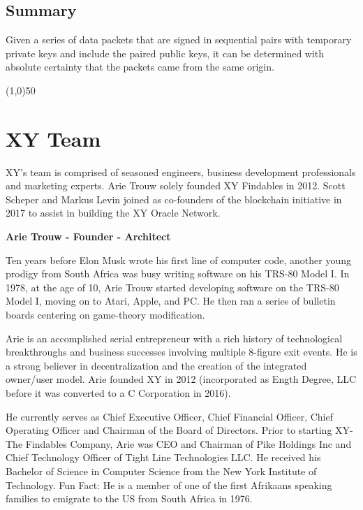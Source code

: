 \documentclass{article}
\begin{document}
\subsection {Summary}
Given a series of data packets that are signed in sequential pairs with temporary private keys and include the paired public keys, it can be determined with absolute \gls{certainty} that the packets came from the same origin.

\begin{center}
\line(1,0){50}
\end{center}
\clearpage

\section {XY Team}
XY's team is comprised of seasoned engineers, business development professionals and marketing experts. Arie Trouw solely founded XY Findables in 2012. Scott Scheper and Markus Levin joined as co-founders of the blockchain initiative in 2017 to assist in building the XY Oracle Network.

\begin {framed}
\begin {center}
\textbf{Arie Trouw - Founder - Architect}\par
\end {center}
Ten years before Elon Musk wrote his first line of computer code, another young prodigy from South Africa was busy writing software on his TRS-80 Model I. In 1978, at the age of 10, Arie Trouw started developing software on the TRS-80 Model I, moving on to Atari, Apple, and PC. He then ran a series of bulletin boards centering on game-theory modification.

Arie is an accomplished serial entrepreneur with a rich history of technological breakthroughs and business successes involving multiple 8-figure exit events. He is a strong believer in decentralization and the creation of the integrated owner/user model. Arie founded XY in 2012 (incorporated as Ength Degree, LLC before it was converted to a C Corporation in 2016).

He currently serves as Chief Executive Officer, Chief Financial Officer, Chief Operating Officer and Chairman of the Board of Directors. Prior to starting XY-The Findables Company, Arie was CEO and Chairman of Pike Holdings Inc and Chief Technology Officer of Tight Line Technologies LLC. He received his Bachelor of Science in Computer Science from the New York Institute of Technology. Fun Fact: He is a member of one of the first Afrikaans speaking families to emigrate to the US from South Africa in 1976.

\end {framed}
\end{document}
